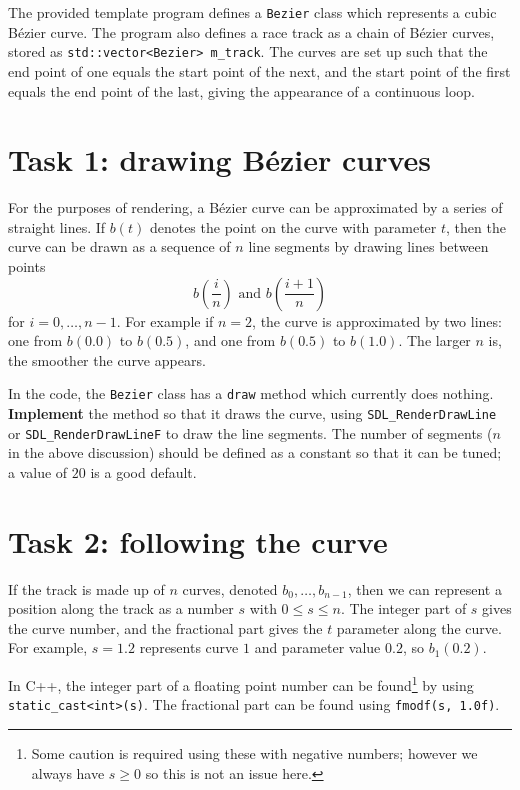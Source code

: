 \documentclass{../../../fal_assignment}
\begin{document}
The provided template program defines a \lstinline{Bezier} class which represents a cubic B\'ezier curve.
The program also defines a race track as a chain of B\'ezier curves,
stored as \lstinline{std::vector<Bezier> m_track}.
The curves are set up such that the end point of one equals the start point of the next, and the start point of the first equals the end point of the last, giving the appearance of a continuous loop.

\section*{Task 1: drawing B\'ezier curves}

For the purposes of rendering, a B\'ezier curve can be approximated by a series of straight lines.
If $b(t)$ denotes the point on the curve with parameter $t$,
then the curve can be drawn as a sequence of $n$ line segments by drawing lines between points
$$ b\left(\frac{i}{n}\right) \text{ and } b\left(\frac{i+1}{n}\right) $$
for $i = 0, \dots, n-1$. For example if $n=2$, the curve is approximated by two lines: one from $b(0.0)$ to $b(0.5)$, and one from $b(0.5)$ to $b(1.0)$. The larger $n$ is, the smoother the curve appears.

In the code, the \lstinline{Bezier} class has a \lstinline{draw} method which currently does nothing.
\textbf{Implement} the method so that it draws the curve, using \lstinline{SDL_RenderDrawLine} or \lstinline{SDL_RenderDrawLineF} to draw the line segments. The number of segments ($n$ in the above discussion) should be defined as a constant so that it can be tuned; a value of $20$ is a good default.

\section*{Task 2: following the curve}

If the track is made up of $n$ curves, denoted $b_0, \dots, b_{n-1}$, then we can represent a position
along the track as a number $s$ with $0 \leq s \leq n$.
The integer part of $s$ gives the curve number, and the fractional part gives the $t$ parameter along the curve. For example, $s=1.2$ represents curve $1$ and parameter value $0.2$, so $b_1(0.2)$.

In C++, the integer part of a floating point number can be found\footnote{Some caution is required using these with negative numbers; however we always have $s \geq 0$ so this is not an issue here.} by using \lstinline{static_cast<int>(s)}.
The fractional part can be found using \lstinline{fmodf(s, 1.0f)}.
\end{document}
